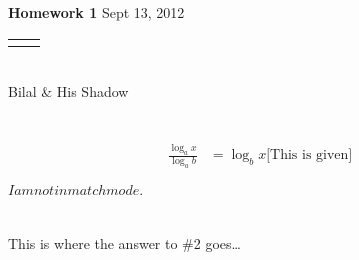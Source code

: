 \documentclass[12pt]{article}
\renewcommand{\title}[1]{\textbf{#1}}
\renewcommand{\line}{\begin{tabularx}{\textwidth}{X>{\raggedleft}X}\hline\\\end{tabularx}\\[-0.5cm]}
\begin{document}
\title{Homework 1}
\hfill Sept 13, 2012
\line
Bilal \& His Shadow


\section{}
\begin{align}
	\frac{\log_{a}{x}}{\log_{a}{b}} &= \log_{b}{x}\mbox{[This is given]}
\end{align}

$I am not in match mode.$
\section{}
This is where the answer to \#2 goes\ldots
\end{document}
